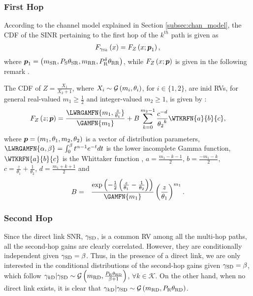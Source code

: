 \documentclass[10pt,journal]{IEEEtran}
\begin{document}
\subsubsection{First Hop} According to the channel model explained in Section \ref{subsec:chan_model}, the \ac{CDF} of the \ac{SINR} pertaining to the first hop of the $k^{th}$ path is given as
\begin{eqnarray}
F_{\gamma_{{\rm S} k}}\left(x\right) = F_{Z}\left(x;\boldsymbol{p}_1\right),
\end{eqnarray}
where $\boldsymbol{p}_1=\left({m_{{\rm S} {\rm R}}},P_{{\rm S}}{\theta_{{\rm S} {\rm R}}},{m_{{\rm R} {\rm R}}},P_{{\rm R}}^\delta{\theta_{{\rm R}{\rm R}}}\right)$, while $F_{Z}\left(x;\boldsymbol{p}\right)$ is given in the following remark \cite{FDR_Nakagami_NCC_paper,201303_WCOML_Alves}.
\begin{remark}[CDF of $Z=\frac{X_1}{X_2+1}$]\label{theorem_gamma_RV_ratio_CDF}
The \ac{CDF} of $Z=\frac{X_1}{X_2+1}$, where $X_i \sim \mathcal{G}\left(m_{i},\theta_{i}\right)$, for $i \in \{1,2\}$, are \ac{inid} RVs,  for general real-valued $m_1\geq \frac{1}{2}$ and integer-valued $m_2\geq 1$, is given by \cite{FDR_Nakagami_NCC_paper,201303_WCOML_Alves}:
\begin{equation}
F_{Z}\left(z;\pv\right)=\frac{\LWRGAMFN{m_1,\frac{z}{\theta_1}}}{\GAMFN{m_1}}+B\sum_{k=0}^{m_2-1}\frac{c^{-d}}{{\theta_2}^{k}} \WTKRFN{a}{b}{c}, \label{CDF_ratio_two_gamma_RVs}
\end{equation}
where $\boldsymbol{p}=\left(m_1,\theta_1,m_2,\theta_2\right)$ is a vector of distribution parameters, $\LWRGAMFN{\alpha,\beta}=\int_0^\beta t^{\alpha-1}e^{-t}dt$ is the lower incomplete Gamma function, $\WTKRFN{a}{b}{c}$ is the Whittaker function \cite[Eq. 13.1.33]{abramowitz_stegun}, $a=\frac{m_1-k-1}{2}$, $b=\frac{-m_1-k}{2}$, $c=\frac{z}{\theta_1}+\frac{1}{\theta_2}$, $d=\frac{m_1+k+1}{2}$ and
\begin{eqnarray}
B&=&\frac{\exp\left({-\frac{1}{2}\left(\frac{z}{\theta_1}-\frac{1}{\theta_2}\right)}\right)}{\GAMFN{m_1}}\left(\frac{z}{\theta_1}\right)^{m_1}.
\end{eqnarray}
\end{remark}
\subsubsection{Second Hop} Since the direct link \ac{SNR}, $\gamma_{{\rm S} {\rm D}}$, is a common \ac{RV} among all the multi-hop paths, all the second-hop gains are clearly correlated. However, they are conditionally independent given $\gamma_{{\rm S} {\rm D}}=\beta$. Thus,  in the presence of a direct link, we are only interested in the conditional distributions of the second-hop gains given $\gamma_{{\rm S} {\rm D}}=\beta$, which follow $\gamma_{k {\rm D}}  \vert  \gamma_{{\rm S} {\rm D}} \sim \mathcal{G}\left({m_{{\rm R} {\rm D}}}, \frac{P_{{\rm R}}{\theta_{{\rm R} {\rm D}}}}{\beta+1}\right)$, $\forall k \in \mathcal{K}$. On the other hand, when no direct link exists, it is clear that $\gamma_{k {\rm D}}  \vert  \gamma_{{\rm S} {\rm D}} \sim \mathcal{G}\left({m_{{\rm R} {\rm D}}}, P_{{\rm R}}{\theta_{{\rm R} {\rm D}}}\right)$.
\end{document}
